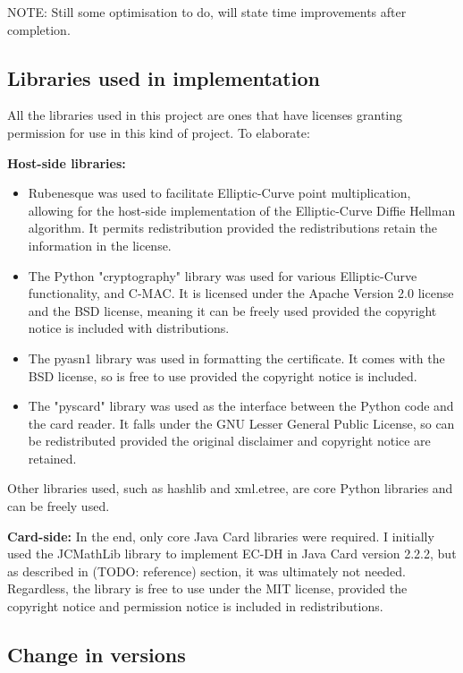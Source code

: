 \documentclass[12pt]{article}
\begin{document}
NOTE: Still some optimisation to do, will state time improvements after completion.


\subsection{Libraries used in implementation}
\label{subsec:libraries}
All the libraries used in this project are ones that have licenses granting permission for use in this kind of project. To elaborate:

\textbf{Host-side libraries:}
\begin{itemize}
	\item Rubenesque was used to facilitate Elliptic-Curve point multiplication, allowing for the host-side implementation of the Elliptic-Curve Diffie Hellman algorithm. It permits redistribution provided the redistributions retain the information in the license.
	
	\item The Python "cryptography" library was used for various Elliptic-Curve functionality, and C-MAC. It is licensed under the Apache Version 2.0 license and the BSD license, meaning it can be freely used provided the copyright notice is included with distributions.
	
	\item The pyasn1 library was used in formatting the certificate. It comes with the BSD license, so is free to use provided the copyright notice is included.
	
	\item The "pyscard" library was used as the interface between the Python code and the card reader. It falls under the GNU Lesser General Public License, so can be redistributed provided the original disclaimer and copyright notice are retained.
\end{itemize}
Other libraries used, such as hashlib and xml.etree, are core Python libraries and can be freely used.

\textbf{Card-side:} In the end, only core Java Card libraries were required. I initially used the JCMathLib library to implement EC-DH in Java Card version 2.2.2, but as described in (TODO: reference) section, it was ultimately not needed. Regardless, the library is free to use under the MIT license, provided the copyright notice and permission notice is included in redistributions.


\subsection{Change in versions}
\label{subsec:version_change}
\end{document}
